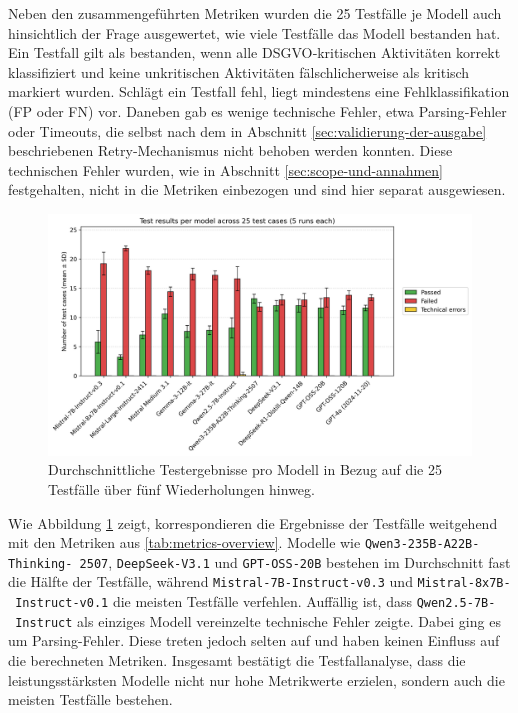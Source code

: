 Neben den zusammengeführten Metriken wurden die 25 Testfälle je Modell auch hinsichtlich der Frage ausgewertet, wie viele Testfälle das Modell bestanden hat. Ein Testfall gilt als bestanden, wenn alle \ac{DSGVO}‑kritischen Aktivitäten korrekt klassifiziert und keine unkritischen Aktivitäten fälschlicherweise als kritisch markiert wurden. Schlägt ein Testfall fehl, liegt mindestens eine Fehlklassifikation (\ac{FP} oder \ac{FN}) vor. Daneben gab es wenige technische Fehler, etwa Parsing‑Fehler oder Timeouts, die selbst nach dem in Abschnitt  \ref{sec:validierung-der-ausgabe} beschriebenen Retry‑Mechanismus nicht behoben werden konnten. Diese technischen Fehler wurden, wie in Abschnitt \ref{sec:scope-und-annahmen} festgehalten, nicht in die Metriken einbezogen und sind hier separat ausgewiesen.

\begin{figure}[htbp]
    \centering
    \includegraphics[width=\textwidth]{images/results/evaluation_testcase_outcomes_grouped_en}
    \caption{Durchschnittliche Testergebnisse pro Modell in Bezug auf die 25 Testfälle über fünf Wiederholungen hinweg.}
    \label{fig:results-testcase-outcomes}
\end{figure}

Wie Abbildung \ref{fig:results-testcase-outcomes} zeigt, korrespondieren die Ergebnisse der Testfälle weitgehend mit den Metriken aus \autoref{tab:metrics-overview}. Modelle wie \texttt{Qwen3-235B-A22B-Thinking-\linebreak~2507}, \texttt{DeepSeek-V3.1} und \texttt{GPT-OSS-20B} bestehen im Durchschnitt fast die Hälfte der Testfälle, während \texttt{Mistral-7B-Instruct-v0.3} und \texttt{Mistral-8x7B-\linebreak~Instruct-v0.1} die meisten Testfälle verfehlen. Auffällig ist, dass \texttt{Qwen2.5-7B-\linebreak~Instruct} als einziges Modell vereinzelte technische Fehler zeigte. Dabei ging es um Parsing-Fehler. Diese treten jedoch selten auf und haben keinen Einfluss auf die berechneten Metriken. Insgesamt bestätigt die Testfallanalyse, dass die leistungsstärksten Modelle nicht nur hohe Metrikwerte erzielen, sondern auch die meisten Testfälle bestehen.